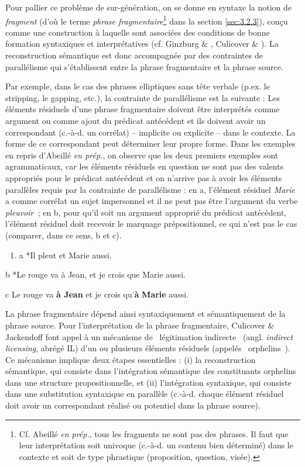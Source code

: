 Pour pallier ce problème de sur-génération, on se donne en syntaxe la notion de \textit{fragment} (d'où le terme \textit{phrase fragmentaire}\footnote{Cf. Abeillé \textit{en prép.}, tous les fragments ne sont pas des phrases. Il faut que leur interprétation soit univoque (c.-à-d. un contenu bien déterminé) dans le contexte et soit de type phrastique (proposition, question, visée).} dans la section \ref{sec:3.2.3}), conçu comme une construction à laquelle sont associées des conditions de bonne formation syntaxiques et interprétatives (cf. Ginzburg \& \citet{Sag2000}, Culicover \& \citet{Jackendoff2005}). La reconstruction sémantique est donc accompagnée par des contraintes de parallélisme qui s'établissent entre la phrase fragmentaire et la phrase source. 

Par exemple, dans le cas des phrases elliptiques sans tête verbale (p.ex. le stripping, le gapping, etc.), la contrainte de parallélisme est la suivante : Les éléments résiduels d'une phrase fragmentaire doivent être interprétés comme argument ou comme ajout du prédicat antécédent et ils doivent avoir un correspondant (c.-à-d. un corrélat) -- implicite ou explicite -- dans le contexte. La forme de ce correspondant peut déterminer leur propre forme. Dans les exemples en  repris d'Abeillé \textit{en prép.}, on observe que les deux premiers exemples sont agrammaticaux, car les éléments résiduels en question ne sont pas des valents appropriés pour le prédicat antécédent et on n'arrive pas à avoir les éléments parallèles requis par la contrainte de parallélisme : en a, l'élément résiduel \textit{Marie} a comme corrélat un sujet impersonnel et il ne peut pas être l'argument du verbe \textit{pleuvoir~}; en b, pour qu'il soit un argument approprié du prédicat antécédent, l'élément résiduel doit recevoir le marquage prépositionnel, ce qui n'est pas le cas (comparer, dans ce sens, b et c).


\begin{enumerate}
\item \label{bkm:Ref306126652}a  *Il pleut et Marie aussi. 


\end{enumerate}
  b  *Le rouge va à Jean, et je crois que Marie aussi.

  c  Le rouge va \textbf{à Jean} et je crois qu'\textbf{à} \textbf{Marie} aussi. 

La phrase fragmentaire dépend ainsi syntaxiquement et sémantiquement de la phrase source. Pour l'interprétation de la phrase fragmentaire, Culicover \& Jackendoff font appel à un mécanisme de {\guillemotleft}~légitimation indirecte~{\guillemotright} (angl. \textit{indirect licensing}, abrégé IL) d'un ou plusieurs éléments résiduels (appelés {\guillemotleft}~orphelins~{\guillemotright}). Ce mécanisme implique deux étapes essentielles : (i) la reconstruction sémantique, qui consiste dans l'intégration sémantique des constituants orphelins dans une structure propositionnelle, et (ii) l'intégration syntaxique, qui consiste dans une substitution syntaxique en parallèle (c.-à-d. chaque élément résiduel doit avoir un correspondant réalisé ou potentiel dans la phrase source).

